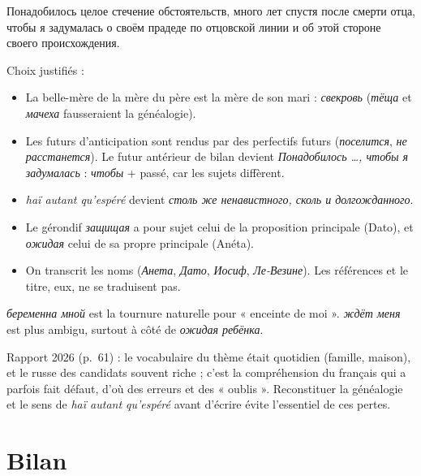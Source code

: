 \documentclass[11pt,a4paper]{article}
\providecommand{\tightlist}{\setlength{\itemsep}{0pt}\setlength{\parskip}{0pt}}
\begin{document}
Понадобилось целое стечение обстоятельств, много лет спустя после смерти отца, чтобы я задумалась о своём прадеде по отцовской линии и об этой стороне своего происхождения.

Choix justifiés :

\begin{itemize}
\tightlist
\item
  La belle-mère de la mère du père est la mère de son mari : \emph{свекровь} (\emph{тёща} et \emph{мачеха} fausseraient la généalogie).
\item
  Les futurs d'anticipation sont rendus par des perfectifs futurs (\emph{поселится}, \emph{не расстанется}). Le futur antérieur de bilan devient \emph{Понадобилось \ldots, чтобы я задумалась} : \emph{чтобы} + passé, car les sujets diffèrent.
\item
  \emph{haï autant qu'espéré} devient \emph{столь же ненавистного, сколь и долгожданного}.
\item
  Le gérondif \emph{защищая} a pour sujet celui de la proposition principale (Dato), et \emph{ожидая} celui de sa propre principale (Anéta).
\item
  On transcrit les noms (\emph{Анета}, \emph{Дато}, \emph{Иосиф}, \emph{Ле-Везине}). Les références et le titre, eux, ne se traduisent pas.
\end{itemize}

\begin{piege}

\emph{беременна мной} est la tournure naturelle pour « enceinte de moi ». \emph{ждёт меня} est plus ambigu, surtout à côté de \emph{ожидая ребёнка}.

\end{piege}

\begin{jury}

Rapport 2026 (p.~61) : le vocabulaire du thème était quotidien (famille, maison), et le russe des candidats souvent riche ; c'est la compréhension du français qui a parfois fait défaut, d'où des erreurs et des « oublis ». Reconstituer la généalogie et le sens de \emph{haï autant qu'espéré} avant d'écrire évite l'essentiel de ces pertes.

\end{jury}

\hypertarget{bilan}{%
\section{Bilan}\label{bilan}}
\end{document}
